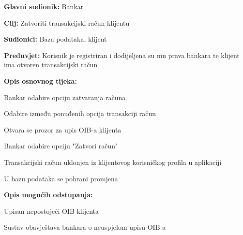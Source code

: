                \noindent {}
                \begin{packed_item}
                
                  \item \textbf{Glavni sudionik: }Bankar
                  \item  \textbf{Cilj:} Zatvoriti transakcijski račun klijentu
                  \item  \textbf{Sudionici:} Baza podataka, klijent
                  \item  \textbf{Preduvjet:} Korisnik je registriran i dodijeljena su mu prava bankara te klijent ima otvoren transakcijski račun
                  \item  \textbf{Opis osnovnog tijeka:}
                  
                  \item[] \begin{packed_enum}
                
                    \item Bankar odabire opciju zatvaranja računa
                    \item Odabire između  ponuđenih opcija transakciji račun 
                    \item Otvara se prozor za upis OIB-a klijenta 
                    \item Bankar odabire opciju "Zatvori račun"
                    \item Transakcijski račun uklonjen  iz klijentovog korisničkog profila u aplikaciji
                    \item U bazu podataka se pohrani promjena
                  \end{packed_enum}
                  
                  \item  \textbf{Opis mogućih odstupanja:}
                  
                  \item[] \begin{packed_item}
                
                    \item[3.a] Upisan nepostojeći OIB klijenta
                    \item[] \begin{packed_enum}
                      
                      \item Sustav obavještava bankara o neuspjelom upisu OIB-a 
                      
                    \end{packed_enum}
                    
                  \end{packed_item}
                \end{packed_item}
                
